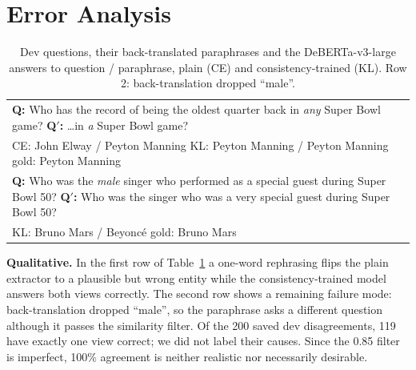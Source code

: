 \documentclass[11pt]{article}
\begin{document}
\section{Error Analysis}
\label{sec:analysis}
\begin{table}[t]
\centering\footnotesize
\begin{tabular}{@{}p{\columnwidth}@{}}
\toprule
\textbf{Q:} Who has the record of being the oldest quarter back in \emph{any} Super Bowl game? \; \textbf{Q$'$:} \ldots in \emph{a} Super Bowl game? \\
CE: John Elway / Peyton Manning \quad KL: Peyton Manning / Peyton Manning \quad gold: Peyton Manning \\
\midrule
\textbf{Q:} Who was the \emph{male} singer who performed as a special guest during Super Bowl 50? \; \textbf{Q$'$:} Who was the singer who was a very special guest during Super Bowl 50? \\
KL: Bruno Mars / Beyoncé \quad gold: Bruno Mars \\
\bottomrule
\end{tabular}
\caption{Dev questions, their back-translated paraphrases and the DeBERTa-v3-large answers to question / paraphrase, plain (CE) and consistency-trained (KL). Row 2: back-translation dropped ``male''.}
\label{tab:qual}
\end{table}

\textbf{Qualitative.} In the first row of Table~\ref{tab:qual} a one-word rephrasing flips the plain extractor to a plausible but wrong entity while the consistency-trained model answers both views correctly. The second row shows a remaining failure mode: back-translation dropped ``male'', so the paraphrase asks a different question although it passes the similarity filter. Of the 200 saved dev disagreements, 119 have exactly one view correct; we did not label their causes. Since the 0.85 filter is imperfect, 100\% agreement is neither realistic nor necessarily desirable.
\end{document}
